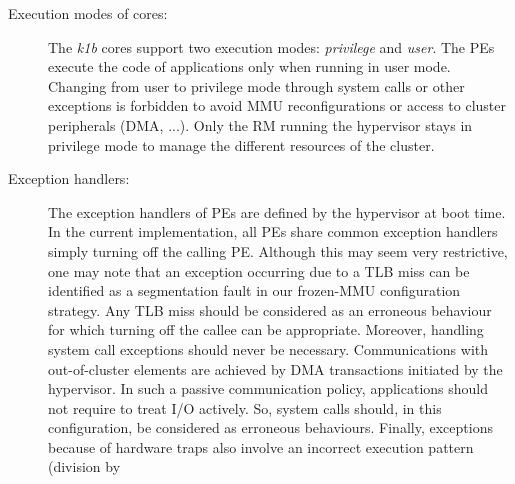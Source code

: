 \documentclass[main.tex]{subfiles}
\begin{document}
\begin{description}
    \item[Execution modes of cores: ] The \emph{k1b} cores support two
        execution modes: \emph{privilege} and \emph{user}. The PEs execute the
        code of applications only when running in user mode. Changing from user
        to privilege mode through system calls or other exceptions is forbidden
        to avoid MMU reconfigurations or access to cluster peripherals (DMA,
        ...). Only the RM running the hypervisor stays in privilege mode to
        manage the different resources of the cluster.
    \item[Exception handlers: ] The exception handlers of PEs are defined by
        the hypervisor at boot time. In the current implementation, all PEs
        share common exception handlers simply turning off the calling PE.
        Although this may seem very restrictive, one may note that an exception
        occurring due to a TLB miss can be identified as a segmentation fault
        in our frozen-MMU configuration strategy. Any TLB miss should be
        considered as an erroneous behaviour for which turning off the callee
        can be appropriate. Moreover, handling system call exceptions should
        never be necessary. Communications with out-of-cluster elements are
        achieved by DMA transactions initiated by the hypervisor. In such a
        passive communication policy, applications should not require to treat
        I/O actively. So, system calls should, in this configuration, be
        considered as erroneous behaviours. Finally, exceptions because of
        hardware traps also involve an incorrect execution pattern (division by

\end{description}
\end{document}
